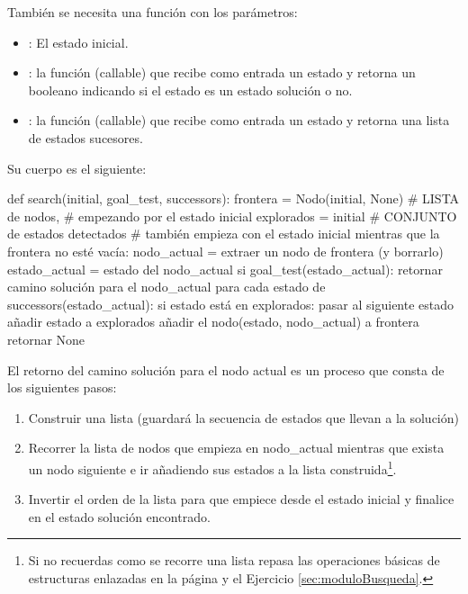\noindent También se necesita una función con los parámetros:
\begin{itemize}
\item {}: El estado inicial.
\item {}: la función (callable) que recibe como entrada un estado y retorna un booleano indicando si el estado es un estado solución o no.
\item {}: la función (callable) que recibe como entrada un estado y retorna una lista de estados sucesores.
\end{itemize}

Su cuerpo es el siguiente:  \label{algorithm:search}

\hfil \begin{minipage}{.85\textwidth}
\begin{pyverbatim}[][frame=single]
def search(initial, goal_test, successors):
  frontera = {Nodo(initial, None)}  # LISTA de nodos, 
                                    # empezando por el estado inicial
  explorados = {initial}            # CONJUNTO de estados detectados
                                    # también empieza con el estado inicial
  mientras que la frontera no esté vacía:
     nodo_actual = extraer un nodo de frontera (y borrarlo)
     estado_actual = estado del nodo_actual
     si goal_test(estado_actual):
         retornar camino solución para el nodo_actual
     para cada estado de successors(estado_actual):
         si estado está en explorados:
             pasar al siguiente estado
         añadir estado a explorados
         añadir el nodo(estado, nodo_actual) a frontera
  retornar None
\end{pyverbatim}
\end{minipage}

El retorno del camino solución para el nodo actual es un proceso que consta de
los siguientes pasos:
\begin{enumerate}
\item Construir una lista (guardará la secuencia de estados que llevan a la solución)
\item Recorrer la lista de nodos que empieza en nodo\_actual mientras que exista un nodo siguiente e ir añadiendo sus estados a la lista construida\footnote{Si no recuerdas como se recorre una lista repasa las operaciones básicas de estructuras enlazadas 
 en la página \pageref{sec:EstructurasEnlazadas} y el Ejercicio  \ref{sec:moduloBusqueda}.}.
\item Invertir el orden de la lista para que empiece desde el estado inicial y finalice en el estado solución encontrado.
\end{enumerate}



